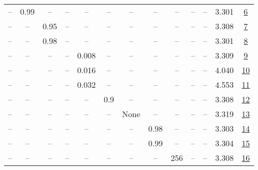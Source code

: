 \begin{table}[H]
\begin{tabular}{ccccccccccccc}
-- & 0.99 & -- & -- & -- & -- & -- & -- & -- & -- & -- & 3.301 & \href{https://wandb.ai/stanford-mercury/optimizer-scaling/runs/sweep-130m-10B-mudamhb1b884lr0.004-alr0.008-wd0.2-minlr0-warmup5-54e72d}{6} \\
-- & -- & 0.95 & -- & -- & -- & -- & -- & -- & -- & -- & 3.308 & \href{https://wandb.ai/stanford-mercury/optimizer-scaling/runs/sweep-130m-10B-mudamhecb30dlr0.004-alr0.008-wd0.2-minlr0-warmup5-0e41b1}{7} \\
-- & -- & 0.98 & -- & -- & -- & -- & -- & -- & -- & -- & 3.301 & \href{https://wandb.ai/stanford-mercury/optimizer-scaling/runs/sweep-130m-10B-mudamha980a6lr0.004-alr0.008-wd0.2-minlr0-warmup5-2c58d4}{8} \\
-- & -- & -- & -- & 0.008 & -- & -- & -- & -- & -- & -- & 3.309 & \href{https://wandb.ai/stanford-mercury/optimizer-scaling/runs/sweep-130m-10B-mudamhbd426elr0.008-alr0.008-wd0.2-minlr0-warmup5-85334f}{9} \\
-- & -- & -- & -- & 0.016 & -- & -- & -- & -- & -- & -- & 4.040 & \href{https://wandb.ai/stanford-mercury/optimizer-scaling/runs/sweep-130m-10B-mudamhf92407lr0.016-alr0.008-wd0.2-minlr0-warmup5-68b6b0}{10} \\
-- & -- & -- & -- & 0.032 & -- & -- & -- & -- & -- & -- & 4.553 & \href{https://wandb.ai/stanford-mercury/optimizer-scaling/runs/sweep-130m-10B-mudamhfb7c63lr0.032-alr0.008-wd0.2-minlr0-warmup5-10e0e5}{11} \\
-- & -- & -- & -- & -- & 0.9 & -- & -- & -- & -- & -- & 3.308 & \href{https://wandb.ai/stanford-mercury/optimizer-scaling/runs/sweep-130m-10B-mudamh2a12ablr0.004-alr0.008-wd0.2-minlr0-warmup5-61c6ef}{12} \\
-- & -- & -- & -- & -- & -- & None & -- & -- & -- & -- & 3.319 & \href{https://wandb.ai/stanford-mercury/optimizer-scaling/runs/sweep-130m-10B-mudamh09df46lr0.004-alr0.008-wd0.2-minlr0-warmup5-64cea5}{13} \\
-- & -- & -- & -- & -- & -- & -- & 0.98 & -- & -- & -- & 3.303 & \href{https://wandb.ai/stanford-mercury/optimizer-scaling/runs/sweep-130m-10B-mudamh16212alr0.004-alr0.008-wd0.2-minlr0-warmup5-540efa}{14} \\
-- & -- & -- & -- & -- & -- & -- & 0.99 & -- & -- & -- & 3.304 & \href{https://wandb.ai/stanford-mercury/optimizer-scaling/runs/sweep-130m-10B-mudamh93dfb6lr0.004-alr0.008-wd0.2-minlr0-warmup5-782b20}{15} \\
-- & -- & -- & -- & -- & -- & -- & -- & 256 & -- & -- & 3.308 & \href{https://wandb.ai/stanford-mercury/optimizer-scaling/runs/sweep-130m-10B-mudamhcfaf6blr0.004-alr0.008-wd0.2-minlr0-warmup5-12e95e}{16} \\

\end{tabular}
\end{table}
